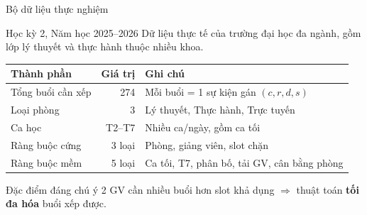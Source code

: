 \documentclass[aspectratio=169,10pt]{beamer}
\begin{document}
\begin{frame}{Bộ dữ liệu thực nghiệm}
\begin{block}{Học kỳ 2, Năm học 2025--2026}
Dữ liệu thực tế của trường đại học đa ngành, gồm lớp lý thuyết và thực hành thuộc nhiều khoa.
\end{block}

\vspace{0.2cm}
\begin{table}
\centering
\footnotesize
\begin{tabular}{@{}lrl@{}}
\toprule
\textbf{Thành phần} & \textbf{Giá trị} & \textbf{Ghi chú} \\
\midrule
Tổng buổi cần xếp & 274 & Mỗi buổi = 1 sự kiện gán $(c, r, d, s)$ \\
Loại phòng & 3 & Lý thuyết, Thực hành, Trực tuyến \\
Ca học & T2--T7 & Nhiều ca/ngày, gồm ca tối \\
Ràng buộc cứng & 3 loại & Phòng, giảng viên, slot chặn \\
Ràng buộc mềm & 5 loại & Ca tối, T7, phân bố, tải GV, cân bằng phòng \\
\bottomrule
\end{tabular}
\end{table}

\vspace{0.15cm}
\begin{exampleblock}{Đặc điểm đáng chú ý}
2 GV cần nhiều buổi hơn slot khả dụng $\Rightarrow$ thuật toán \textbf{tối đa hóa} buổi xếp được.
\end{exampleblock}
\end{frame}
\end{document}
